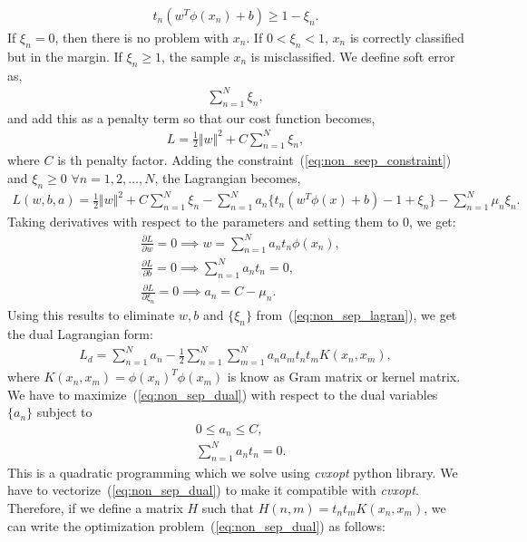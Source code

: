 \begin{align}\label{eq:non_seep_constraint}
	t_n(w^T\phi(x_n)+b) \geq 1- \xi_n.
\end{align}
If $\xi_n = 0$, then there is no problem with $x_n$. If $0 <\xi_n<1$, $x_n$ is correctly classified but in the margin. If $\xi_n \geq 1$, the sample $x_n$ is misclassified. We deefine soft error as,
\begin{align*}
	\sum_{n=1}^N \xi_n,
\end{align*}
and add this as a penalty term so that our cost function becomes,
\begin{align*}
	L = \frac{1}{2}\Vert w \Vert^2 + C \sum_{n=1}^N \xi_n,
\end{align*}
where $C$ is th penalty factor. Adding the constraint~(\ref{eq:non_seep_constraint}) and $\xi_n \geq 0$ $ \forall n=1,2,\ldots,N$, the Lagrangian becomes,
\begin{align}\label{eq:non_sep_lagran}
	L(w, b, a) = \frac{1}{2}\Vert w \Vert^2 + C\sum_{n=1}^N \xi_n - \sum_{n=1}^N a_n\{t_n(w^T\phi(x)+b)-1+\xi_n\}-\sum_{n=1}^N \mu_n \xi_n.
\end{align}
Taking derivatives with respect to the parameters and setting them to $0$, we get:
\begin{align}\label{eq:non_sep_pdiff}
	&\frac{\partial L}{\partial w} = 0 \implies w = \sum_{n=1}^N a_nt_n\phi(x_n), \nonumber\\
	&\frac{\partial L}{\partial b} = 0 \implies \sum_{n=1}^N a_nt_n = 0,\nonumber\\
	&\frac{\partial L}{\partial \xi_n} = 0 \implies a_n = C-\mu_n.
\end{align}
Using this results to eliminate $w,b$ and $\{\xi_n\}$ from~(\ref{eq:non_sep_lagran}), we get the dual Lagrangian form:
\begin{align}\label{eq:non_sep_dual}
	L_d = \sum_{n=1}^N a_n - \frac{1}{2}\sum_{n=1}^N \sum_{m=1}^N a_na_mt_nt_m K(x_n, x_m),
\end{align}
where $K(x_n, x_m) = \phi(x_n)^T\phi(x_m)$ is know as Gram matrix or kernel matrix. We have to maximize~(\ref{eq:non_sep_dual}) with respect to the dual variables $\{a_n\}$ subject to
\begin{align*}
	&0 \leq a_n \leq C,\\
	&\sum_{n=1}^N a_nt_n = 0.
\end{align*}
This is a quadratic programming which we solve using \textit{cvxopt} python library. We have to vectorize~(\ref{eq:non_sep_dual}) to make it compatible with \textit{cvxopt}. Therefore, if we define a matrix $H$ such that $H(n,m) = t_n t_m K(x_n, x_m)$, we can write the optimization problem~(\ref{eq:non_sep_dual}) as follows:

